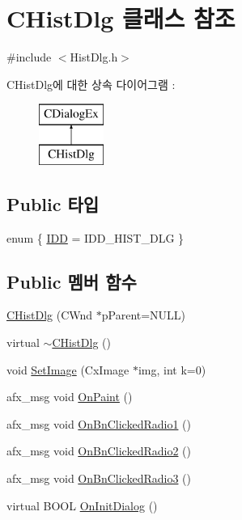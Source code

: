 \hypertarget{class_c_hist_dlg}{\section{C\-Hist\-Dlg 클래스 참조}
\label{class_c_hist_dlg}
}


{\ttfamily \#include $<$Hist\-Dlg.\-h$>$}

C\-Hist\-Dlg에 대한 상속 다이어그램 \-: \begin{figure}[H]
\begin{center}
\leavevmode
\includegraphics[height=2.000000cm]{class_c_hist_dlg}
\end{center}
\end{figure}
\subsection*{Public 타입}
\begin{DoxyCompactItemize}
\item 
enum \{ \hyperlink{class_c_hist_dlg_ac536fdef65118a44834ace1e795b5d53a6355bda489fa5ea40bdc03fb4ea1baea}{I\-D\-D} = I\-D\-D\-\_\-\-H\-I\-S\-T\-\_\-\-D\-L\-G
 \}
\end{DoxyCompactItemize}
\subsection*{Public 멤버 함수}
\begin{DoxyCompactItemize}
\item 
\hyperlink{class_c_hist_dlg_aa172ce29b9e60682f146391eff5fdce0}{C\-Hist\-Dlg} (C\-Wnd $\ast$p\-Parent=N\-U\-L\-L)
\item 
virtual \hyperlink{class_c_hist_dlg_a16e7c76fa6892cb0545974d62a089521}{$\sim$\-C\-Hist\-Dlg} ()
\item 
void \hyperlink{class_c_hist_dlg_a29a406cadf520060ad60a7a9a246ac57}{Set\-Image} (Cx\-Image $\ast$img, int k=0)
\item 
afx\-\_\-msg void \hyperlink{class_c_hist_dlg_ada0bb1f41d5042d24816802a405b064e}{On\-Paint} ()
\item 
afx\-\_\-msg void \hyperlink{class_c_hist_dlg_a9cf978b6cac92b42356db7e01502bd25}{On\-Bn\-Clicked\-Radio1} ()
\item 
afx\-\_\-msg void \hyperlink{class_c_hist_dlg_afddab2267513f03160832fb11491d58d}{On\-Bn\-Clicked\-Radio2} ()
\item 
afx\-\_\-msg void \hyperlink{class_c_hist_dlg_a1afa7ec674ebbe137b275d5c62f967db}{On\-Bn\-Clicked\-Radio3} ()
\item 
virtual B\-O\-O\-L \hyperlink{class_c_hist_dlg_ae655e453dd12a2ee5db4c1ab2bb57c88}{On\-Init\-Dialog} ()
\end{DoxyCompactItemize}

